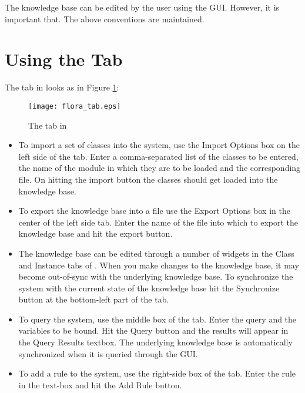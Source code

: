 The \Protege knowledge base can be edited by the user using the GUI.
However, it is important that. The above conventions are maintained.

\section{Using the \FLSYSTEM Tab}
The \FLSYSTEM tab in \Protege looks as in Figure
\ref{fig:flora-protege}:
\begin{figure}
\begin{center}
\texttt{[image: flora\_tab.eps]}
\caption{The \FLSYSTEM tab in \Protege} \label{fig:flora-protege}
\end{center}
\end{figure}

\begin{itemize}
\item To import a set of \FLSYSTEM classes into the system, use the
Import Options box on the left side of the tab. Enter a
comma-separated list of the classes to be entered, the name of the
module in which they are to be loaded and the corresponding \FLSYSTEM
file. On hitting the import button the \FLSYSTEM classes should get
loaded into the \Protege knowledge base.

\item To export the \Protege knowledge base into a \FLSYSTEM file use
the Export Options box in the center of the left side tab. Enter the
name of the file into which to export the \Protege knowledge base
and hit the export button.

\item The \Protege knowledge base can be edited through a number of
widgets in the Class and Instance tabs of \NoProtege. When you make
changes to the \Protege knowledge base, it may become out-of-sync
with the underlying \FLSYSTEM knowledge base. To synchronize the \FLSYSTEM
system with the current state of the \Protege knowledge base hit the
Synchronize button at the bottom-left part of the tab.

\item To query the \FLSYSTEM system, use the middle box of the tab.
Enter the query and the variables to be bound. Hit the Query button
and the results will appear in the Query Results textbox. The
underlying \FLSYSTEM knowledge base is automatically synchronized when it is
queried through the GUI.

\item To add a rule to the \FLSYSTEM system, use the right-side box of
the tab. Enter the rule in the text-box and hit the Add Rule button.
\end{itemize}

